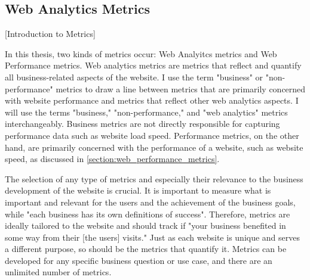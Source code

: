 


\subsection{Web Analytics Metrics} %
\label{subsection:web_analytics_metrics}


[Introduction to Metrics]




In this thesis, two kinds of metrics occur: Web Analyitcs metrics and Web Performance metrics.
Web analytics metrics are metrics that reflect and quantify all business-related aspects of the website.
I use the term "business" or "non-performance" metrics to draw a line between metrics that are primarily concerned with website performance and metrics that reflect other web analytics aspects.
I will use the terms "business," "non-performance," and "web analytics" metrics interchangeably.
Business metrics are not directly responsible for capturing performance data such as website load speed.
Performance metrics, on the other hand, are primarily concerned with the performance of a website, such as website speed, as discussed in \ref{section:web_performance_metrics}.


The selection of any type of metrics and especially their relevance to the business development of the website is crucial.
It is important to measure what is important and relevant for the users and the achievement of the business goals, while "each business has its own definitions of success". %
Therefore, metrics are ideally tailored to the website and should track if "your business benefited in some way from their [the users] visits." %
Just as each website is unique and serves a different purpose, so should be the metrics that quantify it.
Metrics can be developed for any specific business question or use case, and there are an unlimited number of metrics.

